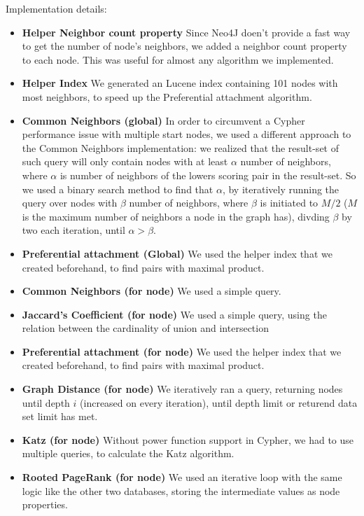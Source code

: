 Implementation details:
\begin{itemize}
	\item {\bf Helper Neighbor count property}
		Since Neo4J doen't provide a fast way to get the number of node's neighbors,
		we added a neighbor count property to each node. This was useful for 
		almost any algorithm we implemented.
	\item {\bf Helper Index}
		We generated an Lucene index containing 101 nodes with most neighbors,
		to speed up the Preferential attachment algorithm.
	\item {\bf Common Neighbors (global)} 
		In order to circumvent a Cypher performance issue with multiple start 
		nodes, we used a different approach to the Common Neighbors implementation:
		we realized that the result-set of such query will only contain nodes with
		at least $\alpha$ number of neighbors, where $\alpha$ is number of neighbors
		of the lowers scoring pair in the result-set.
		So we used a binary search method to find that $\alpha$, by iteratively 
		running the	query over nodes with $\beta$ number of neighbors, where $\beta$
		is initiated to $M/2$ ($M$ is the maximum number of neighbors a node in the
		graph has), divding $\beta$ by two each iteration, until $\alpha > \beta$.
	\item {\bf Preferential attachment (Global)}
        We used the helper index that we created beforehand, to find pairs with 
		maximal product.
	\item {\bf Common Neighbors (for node)}
        We used a simple query.
	\item {\bf Jaccard's Coefficient (for node)}
        We used a simple query, using the relation between the cardinality of 
		union and intersection
	\item {\bf Preferential attachment (for node)}
        We used the helper index that we created beforehand, to find pairs with 
		maximal product.
	\item {\bf Graph Distance (for node)}
		We iteratively ran a query, returning nodes until depth $i$ (increased on 
		every iteration), until depth limit or returend data set limit has met.
	\item {\bf Katz (for node)}
		Without power function support in Cypher, we had to use multiple queries,
		to calculate the Katz algorithm.
	\item {\bf Rooted PageRank (for node)}
        We used an iterative loop with the same logic like the other two databases,
		storing the intermediate values as node properties.
\end{itemize}

